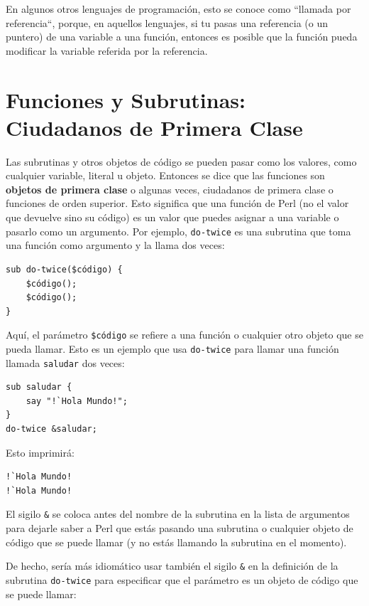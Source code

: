 En algunos otros lenguajes de programación, esto se conoce como
``llamada por referencia``, porque, en aquellos lenguajes, 
si tu pasas una referencia (o un puntero) de una variable a una
función, entonces es posible que la función pueda modificar la
variable referida por la referencia.


\section{Funciones y Subrutinas: Ciudadanos de Primera Clase}
\label{first_class}

Las subrutinas y otros objetos de código se pueden pasar como 
los valores, como cualquier variable, literal u objeto. Entonces
se dice que las funciones son {\bf objetos de primera clase} o algunas
veces, ciudadanos de primera clase o funciones de orden superior. 
Esto significa que una función de Perl (no el valor que devuelve sino
su código) es un valor que puedes asignar a una variable o pasarlo como
un argumento. Por ejemplo, \verb|do-twice| es una subrutina que toma
una función como argumento y la llama dos veces:

\begin{lstlisting}
sub do-twice($código) {
    $código(); 
    $código();
}
\end{lstlisting}

Aquí, el parámetro \verb|$código| se refiere a una función o cualquier
otro objeto que se pueda llamar. Esto es un ejemplo que usa \verb|do-twice|
para llamar una función llamada \verb|saludar| dos veces:

\begin{lstlisting}
sub saludar {
    say "!`Hola Mundo!";
}
do-twice &saludar;
\end{lstlisting}

Esto imprimirá:
\begin{lstlisting}
!`Hola Mundo!
!`Hola Mundo!
\end{lstlisting}

El sigilo \verb|&| se coloca antes del nombre de la subrutina 
en la lista de argumentos para dejarle saber a Perl que estás
pasando una subrutina o cualquier objeto de código 
que se puede llamar (y no estás llamando la
subrutina en el momento).

De hecho, sería más idiomático usar también el sigilo \verb|&|
en la definición de la subrutina \verb|do-twice| para especificar
que el parámetro es un objeto de código que se puede llamar:

